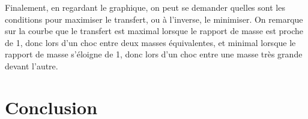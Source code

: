 \documentclass[12pt]{article}
\begin{document}
Finalement, en regardant le graphique, on peut se demander quelles sont les conditions pour maximiser le transfert, ou à l'inverse, le minimiser. On remarque sur la courbe que le transfert est maximal lorsque
le rapport de masse est proche de 1, donc lors d'un choc entre deux masses équivalentes, et minimal lorsque le rapport de masse s'éloigne de 1, donc lors d'un choc entre une masse très grande devant l'autre.

\section{Conclusion}
\end{document}
